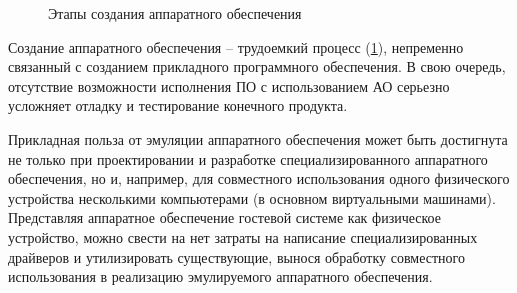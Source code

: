 \begin{figure}[!htbp]
    \centering
    \caption{Этапы создания аппаратного обеспечения}\label{fig:hardware-design}
\end{figure}

Создание аппаратного обеспечения -- трудоемкий процесс (\cref{fig:hardware-design}),
непременно связанный с созданием прикладного программного обеспечения.
В свою очередь, отсутствие возможности исполнения ПО с использованием АО серьезно усложняет отладку и тестирование конечного продукта.

Прикладная польза от эмуляции аппаратного обеспечения может быть достигнута не только
при проектировании и разработке специализированного аппаратного обеспечения, но и, например,
для совместного использования одного физического устройства несколькими компьютерами (в основном
виртуальными машинами).
Представляя аппаратное обеспечение гостевой системе как физическое устройство, можно
свести на нет затраты на написание специализированных драйверов и утилизировать
существующие, вынося обработку совместного использования в реализацию эмулируемого аппаратного обеспечения.

